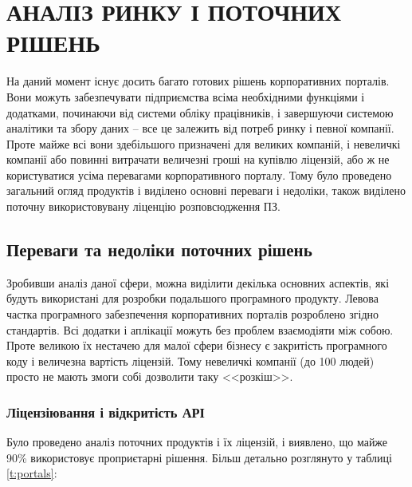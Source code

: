 \section{АНАЛІЗ РИНКУ І ПОТОЧНИХ РІШЕНЬ}
На даний момент існує досить багато готових рішень корпоративних порталів. 
Вони можуть забезпечувати підприємства всіма необхідними функціями і додатками, починаючи від системи обліку працівників, і завершуючи системою аналітики та збору даних -- все це залежить від потреб ринку і певної компанії.
Проте майже всі вони здебільшого призначені для великих компаній, і невеличкі компанії або повинні витрачати величезні гроші на купівлю ліцензій, або ж не користуватися усіма перевагами корпоративного порталу.
Тому було проведено загальний огляд продуктів і виділено основні переваги і недоліки, також виділено поточну використовувану ліценцію розповсюдження ПЗ.
\subsection{Переваги та недоліки поточних рішень}
Зробивши аналіз даної сфери, можна виділити декілька основних аспектів, які будуть використані для розробки подальшого програмного продукту.
Левова частка програмного забезпечення корпоративних порталів розроблено згідно стандартів\cite{portlet2}. 
Всі додатки і аплікації можуть без проблем взаємодіяти між собою. 
Проте великою їх нестачею для малої сфери бізнесу є закритість програмного коду і величезна вартість ліцензій.
Тому невеличкі компанії (до 100 людей) просто не мають змоги собі дозволити таку <<розкіш>>.

\subsubsection{Ліцензіювання і відкритість АРІ}
\par Було проведено аналіз поточних продуктів і їх ліцензій, і виявлено, що майже 90\% використовує проприєтарні рішення.
Більш детально розглянуто у таблиці \ref{t:portals}:

